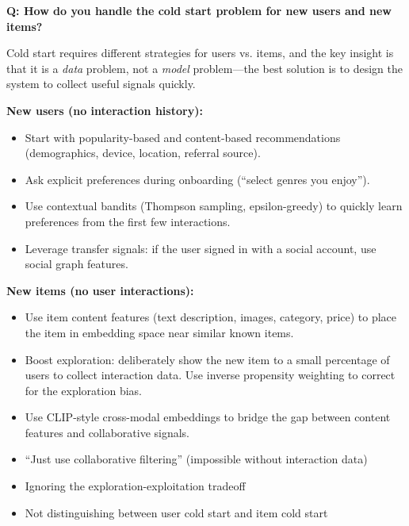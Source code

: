 \begin{interviewq}
\textbf{Q: How do you handle the cold start problem for new users and new items?}

 \quad {} \quad \badgefreq{\freqhigh}

\stronganswer

Cold start requires different strategies for users vs. items, and the key insight is that it is a \textit{data} problem, not a \textit{model} problem---the best solution is to design the system to collect useful signals quickly.

\textbf{New users (no interaction history):}
\begin{itemize}
    \item Start with popularity-based and content-based recommendations (demographics, device, location, referral source).
    \item Ask explicit preferences during onboarding (``select genres you enjoy'').
    \item Use contextual bandits (Thompson sampling, epsilon-greedy) to quickly learn preferences from the first few interactions.
    \item Leverage transfer signals: if the user signed in with a social account, use social graph features.
\end{itemize}

\textbf{New items (no user interactions):}
\begin{itemize}
    \item Use item content features (text description, images, category, price) to place the item in embedding space near similar known items.
    \item Boost exploration: deliberately show the new item to a small percentage of users to collect interaction data. Use inverse propensity weighting to correct for the exploration bias.
    \item Use CLIP-style cross-modal embeddings to bridge the gap between content features and collaborative signals.
\end{itemize}

\redflags
\begin{itemize}
    \item ``Just use collaborative filtering'' (impossible without interaction data)
    \item Ignoring the exploration-exploitation tradeoff
    \item Not distinguishing between user cold start and item cold start
\end{itemize}


\end{interviewq}
